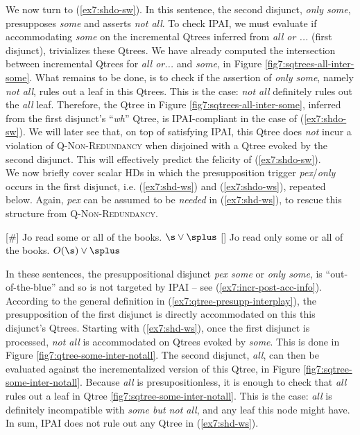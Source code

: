 We now turn to (\ref{ex7:shdo-sw}). In this sentence, the second disjunct, \textit{only some}, presupposes \textit{some} and asserts \textit{not all}. To check IPAI, we must evaluate if accommodating \textit{some} on the incremental Qtrees inferred from \textit{all or ...} (first disjunct), trivializes these Qtrees. We have already computed the intersection between incremental Qtrees for \textit{all or...} and \textit{some}, in Figure \ref{fig7:sqtrees-all-inter-some}. What remains to be done, is to check if the assertion of \textit{only some}, namely \textit{not all}, rules out a leaf in this Qtrees. This is the case: \textit{not all} definitely rules out the \textit{all} leaf. Therefore, the Qtree in Figure \ref{fig7:sqtrees-all-inter-some}, inferred from the first disjunct's ``\textit{wh}'' Qtree, is IPAI-compliant in the case of (\ref{ex7:shdo-sw}). We will later see that, on top of satisfying IPAI, this Qtree does \textit{not} incur a violation of \textsc{Q-Non-Redundancy} when disjoined with a Qtree evoked by the second disjunct. This will effectively predict the felicity of  (\ref{ex7:shdo-sw}).\\

We now briefly cover scalar HDs in which the presupposition trigger \textit{pex}/\textit{only} occurs in the first disjunct, i.e. (\ref{ex7:shd-ws}) and (\ref{ex7:shdo-ws}), repeated below. Again, \textit{pex} can be assumed to be \textit{needed} in (\ref{ex7:shd-ws}), to rescue this structure from \textsc{Q-Non-Redundancy}.

\begin{exe}
	[\#] {Jo read some or all of the books. \hfill $\s\vee\splus$}
	 {Jo read only some or all of the books. \hfill $O(\s)\vee\splus$}
\end{exe}

In these sentences, the presuppositional disjunct \textit{pex some} or \textit{only some}, is ``out-of-the-blue'' and so is not targeted by IPAI -- see (\ref{ex7:incr-post-acc-info}). According to the general definition in (\ref{ex7:qtree-presupp-interplay}), the presupposition of the first disjunct is directly accommodated on this this disjunct's Qtrees. Starting with (\ref{ex7:shd-ws}), once the first disjunct is processed, \textit{not all} is accommodated on Qtrees evoked by \textit{some}. This is done in Figure \ref{fig7:qtree-some-inter-notall}. The second disjunct, \textit{all}, can then be evaluated against the incrementalized version of this Qtree, in Figure \ref{fig7:sqtree-some-inter-notall}. Because \textit{all} is presupositionless, it is enough to check that \textit{all} rules out a leaf in Qtree \ref{fig7:sqtree-some-inter-notall}. This is the case: \textit{all} is definitely incompatible with \textit{some but not all}, and any leaf this node might have. In sum, IPAI does not rule out any Qtree in (\ref{ex7:shd-ws}).

